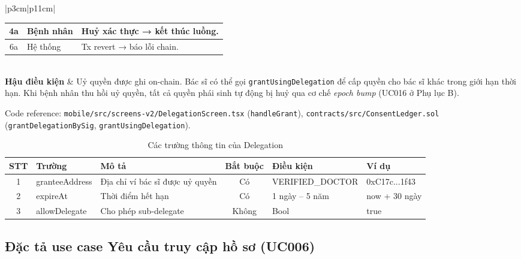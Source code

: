 \documentclass[../DoAn]{subfiles}
\begin{document}
\begin{table}[H]
\begin{tabular}{|p{3cm}|p{11cm}|}
\begin{tabular}{|c|p{2.3cm}|p{6cm}|}
4a & Bệnh nhân & Huỷ xác thực → kết thúc luồng. \\ \hline
6a & Hệ thống & Tx revert → báo lỗi chain. \\ \hline
\end{tabular} \\ \hline
\textbf{Hậu điều kiện} & Uỷ quyền được ghi on-chain. Bác sĩ có thể gọi \texttt{grantUsingDelegation} để cấp quyền cho bác sĩ khác trong giới hạn thời hạn. Khi bệnh nhân thu hồi uỷ quyền, tất cả quyền phái sinh tự động bị huỷ qua cơ chế \textit{epoch bump} (UC016 ở Phụ lục B). \\ \hline
\end{tabular}
\end{table}

Code reference: \texttt{mobile/src/screens-v2/DelegationScreen.tsx} (\texttt{handleGrant}), \texttt{contracts/src/ConsentLedger.sol} (\texttt{grantDelegationBySig}, \texttt{grantUsingDelegation}).

\begin{table}[H]
\centering
\caption{Các trường thông tin của Delegation}
\label{tab:uc005-fields}
\small
\renewcommand{\arraystretch}{1.2}
\begin{tabular}{|c|p{2.8cm}|p{4cm}|c|p{2.3cm}|p{2.2cm}|}
\hline
\textbf{STT} & \textbf{Trường} & \textbf{Mô tả} & \textbf{Bắt buộc} & \textbf{Điều kiện} & \textbf{Ví dụ} \\ \hline
1 & granteeAddress & Địa chỉ ví bác sĩ được uỷ quyền & Có & VERIFIED\_DOCTOR & 0xC17c...1f43 \\ \hline
2 & expireAt & Thời điểm hết hạn & Có & 1 ngày -- 5 năm & now + 30 ngày \\ \hline
3 & allowDelegate & Cho phép sub-delegate & Không & Bool & true \\ \hline
\end{tabular}
\end{table}

\subsection{Đặc tả use case Yêu cầu truy cập hồ sơ (UC006)}
\end{document}
